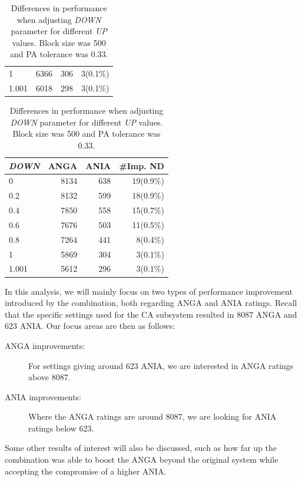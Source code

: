 \begin{table}[ht]
\begin{subtable}[h]{0.45\textwidth}
\begin{tabular}{lrrr}
1     & 6366 & 306 & 3(0.1\%)  \\
1.001 & 6018 & 298 & 3(0.1\%)  
 \end{tabular}
\caption{$\textit{UP} = 0.4$}
\label{tab:UD-difference-0.4}
\end{subtable}
\begin{subtable}[h]{0.45\textwidth}
\centering
\begin{tabular}{lrrr}
\hline
\textit{DOWN} & ANGA  & ANIA & \#Imp. ND  \\ \hline
0     & 8134 & 638 & 19(0.9\%) \\
0.2   & 8132 & 599 & 18(0.9\%) \\
0.4   & 7850 & 558 & 15(0.7\%) \\
0.6   & 7676 & 503 & 11(0.5\%) \\
0.8   & 7264 & 441 & 8(0.4\%)  \\
1     & 5869 & 304 & 3(0.1\%)  \\
1.001 & 5612 & 296 & 3(0.1\%)  
 \end{tabular}
\caption{$\textit{UP} = 0.2$}
\label{tab:UD-difference-0.2}
\end{subtable}

\caption{Differences in performance when adjusting \textit{DOWN} parameter for different \textit{UP} values. Block size was 500 and PA tolerance was 0.33.}
\label{tab:UD-difference}
\end{table}

In this analysis, we will mainly focus on two types of performance improvement introduced by the combination, both regarding ANGA and ANIA ratings.
Recall that the specific settings used for the CA subsystem resulted in 8087 ANGA and 623 ANIA.
Our focus areas are then as follows:

\begin{description}
    \item [ANGA improvements:] For settings giving around 623 ANIA, we are interested in ANGA ratings above 8087.
    \item [ANIA improvements:] Where the ANGA ratings are around 8087, we are looking for ANIA ratings below 623.
\end{description}
Some other results of interest will also be discussed, such as how far up the combination was able to boost the ANGA beyond the original system while accepting the compromise of a higher ANIA.

